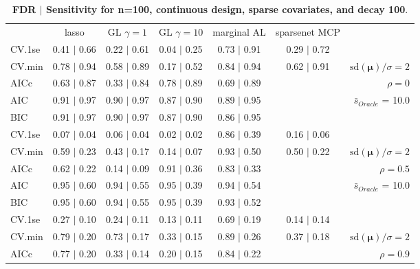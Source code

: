 \begin{table}\vspace{-.5cm}
\caption[l]{ {\it }
{ \bf FDR $\boldsymbol{\mid}$ Sensitivity for n=100, continuous design, sparse covariates, and  decay  100}.}
\vspace{-.5cm}
\footnotesize{}
\begin{center}
\begin{tabular}{l*{5}{c}|r}
 & lasso & GL $\gamma=1$ & GL $\gamma=10$ & marginal AL & sparsenet MCP  & \\
 \cline{1-7}
CV.1se & 0.41 $\mid$ 0.66 & 0.22 $\mid$ 0.61 & 0.04 $\mid$ 0.25 & 0.73 $\mid$ 0.91 & 0.29 $\mid$ 0.72 & \\
CV.min & 0.78 $\mid$ 0.94 & 0.58 $\mid$ 0.89 & 0.17 $\mid$ 0.52 & 0.84 $\mid$ 0.94 & 0.62 $\mid$ 0.91 &  $\mathrm{sd}(\mathbf{\mu})/\sigma=2$ \\
AICc & 0.63 $\mid$ 0.87 & 0.33 $\mid$ 0.84 & 0.78 $\mid$ 0.89 & 0.69 $\mid$ 0.89 & & $\rho=0$ \\
AIC & 0.91 $\mid$ 0.97 & 0.90 $\mid$ 0.97 & 0.87 $\mid$ 0.90 & 0.89 $\mid$ 0.95 & &  \multirow{2}{*}{$\bar{s}_{Oracle}$ = 10.0} \\
BIC & 0.91 $\mid$ 0.97 & 0.90 $\mid$ 0.97 & 0.87 $\mid$ 0.90 & 0.86 $\mid$ 0.95 & &  \\
 \hline 
CV.1se & 0.07 $\mid$ 0.04 & 0.06 $\mid$ 0.04 & 0.02 $\mid$ 0.02 & 0.86 $\mid$ 0.39 & 0.16 $\mid$ 0.06 & \\
CV.min & 0.59 $\mid$ 0.23 & 0.43 $\mid$ 0.17 & 0.14 $\mid$ 0.07 & 0.93 $\mid$ 0.50 & 0.50 $\mid$ 0.22 &  $\mathrm{sd}(\mathbf{\mu})/\sigma=2$ \\
AICc & 0.62 $\mid$ 0.22 & 0.14 $\mid$ 0.09 & 0.91 $\mid$ 0.36 & 0.83 $\mid$ 0.33 & & $\rho=0.5$ \\
AIC & 0.95 $\mid$ 0.60 & 0.94 $\mid$ 0.55 & 0.95 $\mid$ 0.39 & 0.94 $\mid$ 0.54 & &  \multirow{2}{*}{$\bar{s}_{Oracle}$ = 10.0} \\
BIC & 0.95 $\mid$ 0.60 & 0.94 $\mid$ 0.55 & 0.95 $\mid$ 0.39 & 0.93 $\mid$ 0.52 & &  \\
 \hline 
CV.1se & 0.27 $\mid$ 0.10 & 0.24 $\mid$ 0.11 & 0.13 $\mid$ 0.11 & 0.69 $\mid$ 0.19 & 0.14 $\mid$ 0.14 & \\
CV.min & 0.79 $\mid$ 0.20 & 0.73 $\mid$ 0.17 & 0.33 $\mid$ 0.15 & 0.89 $\mid$ 0.26 & 0.37 $\mid$ 0.18 &  $\mathrm{sd}(\mathbf{\mu})/\sigma=2$ \\
AICc & 0.77 $\mid$ 0.20 & 0.33 $\mid$ 0.14 & 0.20 $\mid$ 0.15 & 0.84 $\mid$ 0.22 & & $\rho=0.9$ \\

\end{tabular}
\end{center}
\end{table}

